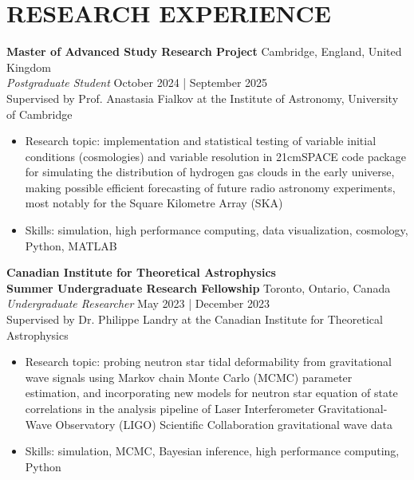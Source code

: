 \documentclass[a4paper,10pt]{extarticle}
\begin{document}
\section*{RESEARCH EXPERIENCE}
\textbf{Master of Advanced Study Research Project} \hfill Cambridge, England, United Kingdom\\
\textit{Postgraduate Student} \hfill October 2024 | September 2025\\
Supervised by Prof. Anastasia Fialkov at the Institute of Astronomy, University of Cambridge
\begin{itemize}
    \item Research topic: implementation and statistical testing of variable initial conditions (cosmologies) and variable resolution in 21cmSPACE code package for simulating the distribution of hydrogen gas clouds in the early universe, making possible efficient forecasting of future radio astronomy experiments, most notably for the Square Kilometre Array (SKA)
    
    \item Skills: simulation, high performance computing, data visualization, cosmology, Python, MATLAB
\end{itemize}

\textbf{Canadian Institute for Theoretical Astrophysics\\
    Summer Undergraduate Research Fellowship} \hfill Toronto, Ontario, Canada\\
\textit{Undergraduate Researcher} \hfill May 2023 | December 2023\\
Supervised by Dr. Philippe Landry at the Canadian Institute for Theoretical Astrophysics
\begin{itemize}
    \item Research topic: probing neutron star tidal deformability from gravitational wave signals using Markov chain Monte Carlo (MCMC) parameter estimation, and incorporating new models for neutron star equation of state correlations in the analysis pipeline of Laser Interferometer Gravitational-Wave Observatory (LIGO) Scientific Collaboration gravitational wave data

    \item Skills: simulation, MCMC, Bayesian inference, high performance computing, Python
\end{itemize}
\end{document}
